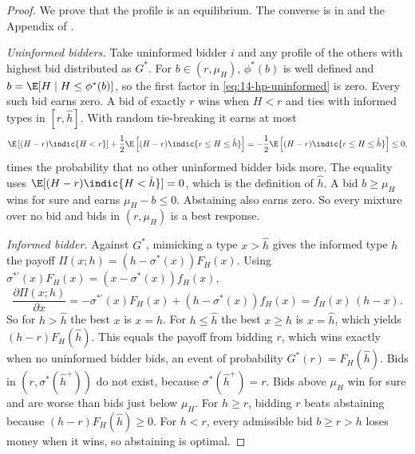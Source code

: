 \begin{proof}
We prove that the profile is an equilibrium. The converse is in \citet{EngelbrechtWiggansMilgromWeber1983}
and the Appendix of \citet{HendricksPorter1988}.

\emph{Uninformed bidders.} Take uninformed bidder $i$ and any profile of the others with highest bid distributed as
$G^*$. For $b\in(r,\mu_H)$, $\phi^*(b)$ is well defined and $b=\E[H\mid H\le\phi^*(b)]$, so the first factor in
\eqref{eq:14-hp-uninformed} is zero. Every such bid earns zero. A bid of exactly $r$ wins when $H<r$ and ties
with informed types in $[r,\hat h]$. With random tie-breaking it earns at most
\begin{equation*}
  \E\left[(H-r)\indic\{H<r\}\right]+\frac{1}{2}\E\left[(H-r)\indic\{r\le H\le\hat h\}\right]
  =-\frac{1}{2}\E\left[(H-r)\indic\{r\le H\le\hat h\}\right]\le0,
\end{equation*}
times the probability that no other uninformed bidder bids more. The equality uses
$\E[(H-r)\indic\{H<\hat h\}]=0$, which is the definition of $\hat h$. A bid $b\ge\mu_H$ wins for sure and
earns $\mu_H-b\le0$. Abstaining also earns zero. So every mixture over no bid and bids in $(r,\mu_H)$ is a best response.

\emph{Informed bidder.} Against $G^*$, mimicking a type $x>\hat h$ gives the informed type $h$ the payoff
$\Pi(x;h)=(h-\sigma^*(x))F_H(x)$. Using $\sigma^{*\prime}(x)F_H(x)=(x-\sigma^*(x))f_H(x)$,
\begin{equation*}
  \frac{\partial\Pi(x;h)}{\partial x}=-\sigma^{*\prime}(x)F_H(x)+\left(h-\sigma^*(x)\right)f_H(x)
  =f_H(x)\,(h-x).
\end{equation*}
So for $h>\hat h$ the best $x$ is $x=h$. For $h\le\hat h$ the best $x\ge\hat h$ is $x=\hat h$, which yields
$(h-r)F_H(\hat h)$. This equals the payoff from bidding $r$, which wins exactly when no uninformed bidder bids,
an event of probability $G^*(r)=F_H(\hat h)$. Bids in $(r,\sigma^*(\hat h^+))$ do not exist, because
$\sigma^*(\hat h^+)=r$. Bids above $\mu_H$ win for sure and are worse than bids just below $\mu_H$. For
$h\ge r$, bidding $r$ beats abstaining because $(h-r)F_H(\hat h)\ge0$. For $h<r$, every admissible bid
$b\ge r>h$ loses money when it wins, so abstaining is optimal.
\end{proof}

